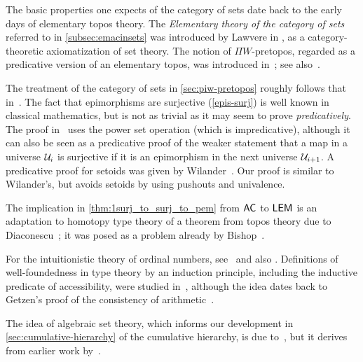 %

\sectionNotes

The basic properties one expects of the category of sets date back to the early days of elementary topos theory.
The \emph{Elementary theory of the category of sets} referred to in \autoref{subsec:emacinsets} was introduced by Lawvere in
\cite{lawvere:etcs-long}, as a category-theoretic axiomatization of set theory.
%
The notion of $\Pi W$-pretopos, regarded as a predicative version of an elementary topos, was introduced in~\cite{MoerdijkPalmgren2002}; see also~\cite{palmgren:cetcs}.

The treatment of the category of sets in \autoref{sec:piw-pretopos} roughly follows that in~\cite{RijkeSpitters}.
The fact that epimorphisms are surjective (\autoref{epis-surj}) is well known in classical mathematics, but is not as trivial as it may seem to prove \emph{predicatively}.
%
The proof in~\cite{Mines/R/R:1988} uses the power set operation (which is impredicative), although it can also be seen as a predicative proof of the weaker statement that a map in a universe $\mathcal{U}_i$ is surjective if it is an epimorphism in the next universe $\mathcal{U}_{i+1}$.
A predicative proof for setoids was given by Wilander~\cite{Wilander2010}. 
Our proof is similar to Wilander's, but avoids setoids by using pushouts and univalence.

The implication in \autoref{thm:1surj_to_surj_to_pem} from $\mathsf{AC}_{}$ to $\mathsf{LEM}_{}$ is an adaptation to homotopy type
theory of a theorem from topos theory due to Diaconescu~\cite{Diaconescu}; it was posed as a problem already by Bishop~\cite[Problem~2]{Bishop1967}.

For the intuitionistic theory of ordinal numbers, see~\cite{taylor:ordinals} and also \cite{JoyalMoerdijk1995}.
Definitions of well-foundedness in type theory by an induction principle, including the inductive predicate of accessibility, were studied in~\cite{Huet80,Paulson86,Nordstrom88}, although the idea dates back to Getzen's proof of the consistency of arithmetic~\cite{Gentzen36}.

The idea of algebraic set theory, which informs our development in \autoref{sec:cumulative-hierarchy} of the cumulative hierarchy, is due to~\cite{JoyalMoerdijk1995}, but it derives from earlier work by~\cite{AczelCZF}.
%
%


